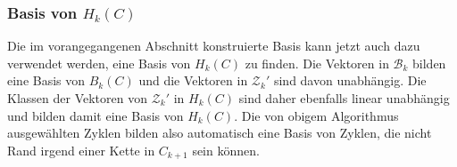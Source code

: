\subsubsection{Basis von $H_k(C)$}
Die im vorangegangenen Abschnitt konstruierte Basis kann jetzt auch
dazu verwendet werden, eine Basis von $H_k(C)$ zu finden.
Die Vektoren in $\mathcal{B}_k$ bilden eine Basis von $B_k(C)$
und die Vektoren in $\mathcal{Z}_k'$ sind davon unabhängig.
Die Klassen der Vektoren von $\mathcal{Z}_k'$ in $H_k(C)$ sind
daher ebenfalls linear unabhängig und bilden damit eine Basis
von $H_k(C)$.
Die von obigem Algorithmus ausgewählten Zyklen bilden also automatisch
eine Basis von Zyklen, die nicht Rand irgend einer Kette in $C_{k+1}$
sein können.
